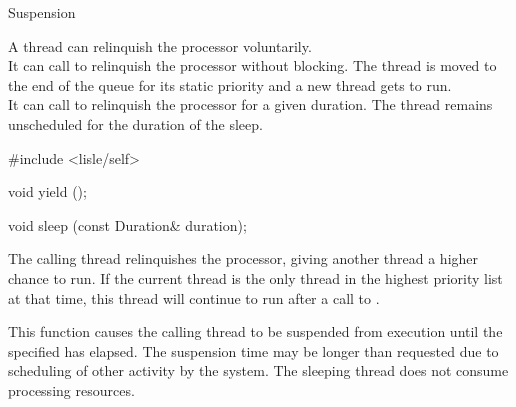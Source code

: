 

\begin{manpage}{Suspension}
\let\savedmanlayout=\manlayout
\renewcommand{\manlayout}{vcompact}

A thread can relinquish the processor voluntarily.
\\
It can call  to relinquish the processor without blocking.
The thread is moved to the end of the queue for its static priority and a new thread gets to run.
\\
It can call  to relinquish the processor for a given duration.
The thread remains unscheduled for the duration of the sleep.

\begin{mansynopsis}
#include <lisle/self>

void yield ();

void sleep (const Duration& duration);
\end{mansynopsis}

\begin{mandescription}
    The calling thread relinquishes the processor, giving another thread a higher chance to run.
    If the current thread is the only thread in the highest priority list at that time, this thread will continue to run after a call to .

    This function causes the calling thread to be suspended from execution until the specified  has elapsed.
    The suspension time may be longer than requested due to scheduling of other activity by the system.
    The sleeping thread does not consume processing resources.
\end{mandescription}

\renewcommand{\manlayout}{\savedmanlayout}
\end{manpage}


